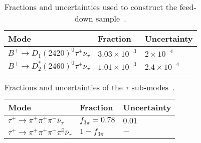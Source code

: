  
    
{
\renewcommand{\arraystretch}{1.25}
 \begin{table}
\centering
\scriptsize
\begin{tabular}{l | l | l }
Mode & Fraction & Uncertainty \\
\hline

$B^{+} \rightarrow D_{1}(2420)^{0} \tau^{+}\nu_{\tau}$ & $3.03\times10^{-3}$  & $2\times 10^{-4}$\\\hline
$B^{+} \rightarrow D_{2}^{*}(2460)^{0} \tau^{+}  \nu_{\tau}$  & $1.01 \times 10^{-3}$ &$2.4 \times 10^{-4}$\\

\end{tabular}
\caption{Fractions and uncertainties used to construct the feed-down sample~\cite{PhysRevD.98.030001}.}
\label{tab:Ds_bkg_modes}
\end{table}
    }
    
{
\renewcommand{\arraystretch}{1.25}
 \begin{table}
\centering
\scriptsize
\begin{tabular}{l | l | l }
Mode & Fraction & Uncertainty \\
\hline

$\tau^{+} \rightarrow \pi^{+} \pi^{+} \pi^{-} \overline{\nu}_{\tau}$ & $f_{3\pi}=0.78$  & $0.01$\\\hline
$\tau^{+} \rightarrow \pi^{+} \pi^{+} \pi^{-} \pi^{0} \overline{\nu}_{\tau}$  & $1-f_{3\pi}$ &$-$\\

\end{tabular}
\caption{Fractions and uncertainties of the $\tau$ sub-modes~\cite{PhysRevD.97.072013}.}
\label{tab:Ds_bkg_modes}
\end{table}
    }
    
    







